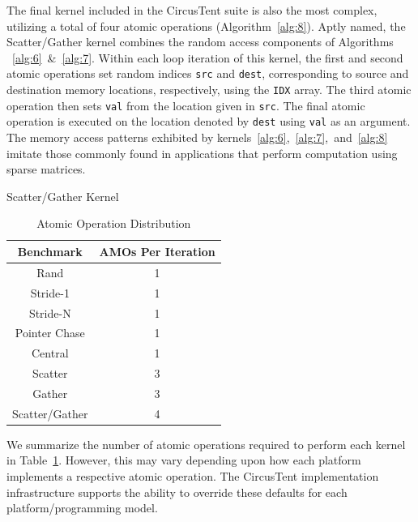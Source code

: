 The final kernel included in the CircusTent suite is also the most complex, utilizing a total of four atomic operations (Algorithm~\ref{alg:8}).
Aptly named, the Scatter/Gather kernel combines the random access components of Algorithms ~\ref{alg:6}~\&~\ref{alg:7}.
Within each loop iteration of this kernel, the first and second atomic operations set random indices \texttt{src} and \texttt{dest}, corresponding to source and destination memory locations, respectively, using the \texttt{IDX} array.
The third atomic operation then sets \texttt{val} from the location given in \texttt{src}.
The final atomic operation is executed on the location denoted by \texttt{dest} using \texttt{val} as an argument.
The memory access patterns exhibited by kernels~\ref{alg:6},~\ref{alg:7},~and~\ref{alg:8} imitate those commonly found in applications that perform computation using sparse matrices.

\begin{algorithm}
\SetAlgoLined
{}
\caption{Scatter/Gather Kernel}
\label{alg:8}
\end{algorithm}  

\begin{table}
  \caption{Atomic Operation Distribution}
  \label{tab:amodistro}
  \begin{tabular}{cc}
    \toprule
    Benchmark&AMOs Per Iteration\\
    \midrule
   Rand & 1\\
   Stride-1 & 1\\
   Stride-N & 1\\
   Pointer Chase & 1\\
   Central & 1\\
   Scatter & 3\\
   Gather & 3\\
   Scatter/Gather & 4\\
  \bottomrule
\end{tabular}
\end{table}

We summarize the number of atomic operations required to perform each kernel in Table~\ref{tab:amodistro}.
However, this may vary depending upon how each platform implements a respective atomic operation.
The CircusTent implementation infrastructure supports the ability to override these defaults for each platform/programming model.

